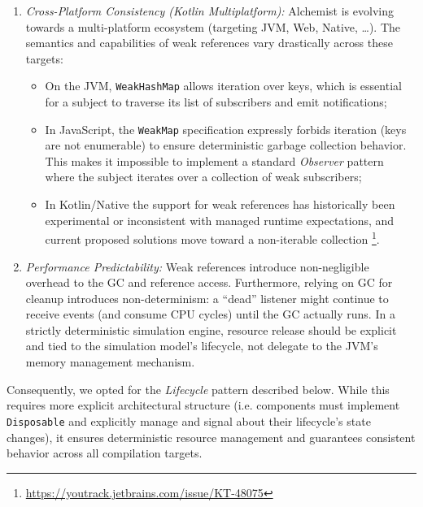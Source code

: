 \begin{enumerate}
	\item \emph{Cross-Platform Consistency (Kotlin Multiplatform):} Alchemist
	      is evolving towards a multi-platform ecosystem (targeting JVM,
	      Web, Native, \dots). The semantics and capabilities of weak
	      references vary drastically across these targets:
	      \begin{itemize}
		      \item On the \ac{JVM}, \texttt{WeakHashMap} allows iteration over keys,
		            which is essential for a subject to traverse its list of
		            subscribers and emit notifications;
		      \item In JavaScript, the \texttt{WeakMap} specification expressly
		            forbids iteration (keys are not enumerable) to ensure deterministic
		            garbage collection behavior. This makes it impossible to implement
		            a standard \emph{Observer} pattern where the subject iterates over
		            a collection of weak subscribers;
		      \item In Kotlin/Native the support for weak references has
		            historically been experimental or inconsistent with managed
		            runtime expectations, and current proposed solutions move
		            toward a non-iterable collection
		            \footnote{\url{https://youtrack.jetbrains.com/issue/KT-48075}}.
	      \end{itemize}
	\item \emph{Performance Predictability:} Weak references introduce
	      non-negligible overhead to the \ac{GC} and reference access.
	      Furthermore, relying on \ac{GC} for cleanup introduces non-determinism:
	      a ``dead'' listener might continue to receive events (and consume CPU
	      cycles) until the \ac{GC} actually runs. In a strictly deterministic
	      simulation engine, resource release should be explicit and tied to the
	      simulation model's lifecycle, not delegate to the \ac{JVM}'s memory
	      management mechanism.
\end{enumerate}

Consequently, we opted for the \emph{Lifecycle} pattern described below. While
this requires more explicit architectural structure (i.e. components must
implement \texttt{Disposable} and explicitly manage and signal about their
lifecycle's state changes), it ensures deterministic resource management and
guarantees consistent behavior across all compilation targets.

